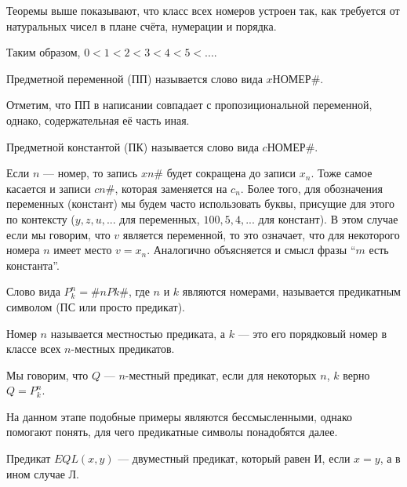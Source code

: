     \begin{Rem}
        Теоремы выше показывают, что класс всех номеров устроен так, как требуется от натуральных чисел в плане счёта, нумерации и порядка.

        Таким образом, $0 < 1 < 2 < 3 < 4 < 5 < ...$.
    \end{Rem}

    \begin{Def}
        Предметной переменной (ПП) называется слово вида $x\text{НОМЕР}\#$.
    \end{Def}

    \begin{Rem}
        Отметим, что ПП в написании совпадает с пропозициональной переменной, однако, содержательная её часть иная.
    \end{Rem}

    \begin{Def}
        Предметной константой (ПК) называется слово вида $c\text{НОМЕР}\#$.
    \end{Def}

    \begin{Rem}
        Если $n$ --- номер, то запись $xn\#$ будет сокращена до записи $x_n$. Тоже самое касается и записи $cn\#$, которая заменяется на $c_n$. Более того, для обозначения переменных (констант) мы будем часто использовать буквы, присущие для этого по контексту ($y, z, u, ...$ для переменных, $100, 5, 4, ...$ для констант). В этом случае если мы говорим, что $v$ является переменной, то это означает, что для некоторого номера $n$ имеет место $v = x_n$. Аналогично объясняется и смысл фразы ``$m$ есть константа''.
    \end{Rem}

    \begin{Def}
        Слово вида $P_k^n = \#nPk\#$, где $n$ и $k$ являются номерами, называется предикатным символом (ПС или просто предикат). 
        
        Номер $n$ называется местностью предиката, а $k$ --- это его порядковый номер в классе всех $n$-местных предикатов.
    \end{Def}

    \begin{Rem}
        Мы говорим, что $Q$ --- $n$-местный предикат, если для некоторых $n$, $k$ верно $Q = P^n_k$.
    \end{Rem}

    \begin{Example}
        На данном этапе подобные примеры являются бессмысленными, однако помогают понять, для чего предикатные символы понадобятся далее.
        
        Предикат $EQL(x,y)$ --- двуместный предикат, который равен И, если $x = y$, а в ином случае Л.
    \end{Example}

